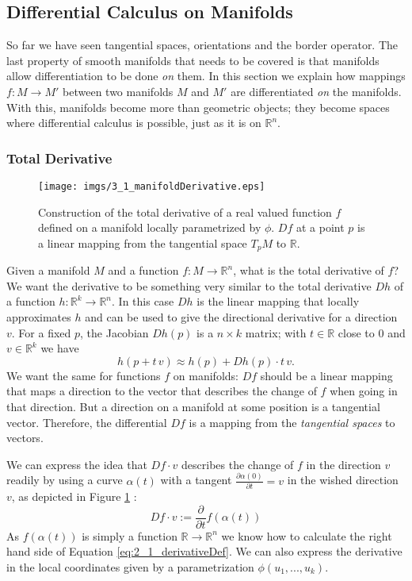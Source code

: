 \subsection{Differential Calculus on Manifolds}
\label{sec::2_derivativesOnMF}
So far we have seen tangential spaces, orientations and the border operator. The last property of smooth manifolds that needs to be covered is that manifolds allow differentiation to be done \emph{on} them. In this section we explain how mappings $f:M\to M'$ between two manifolds $M$ and $M'$ are differentiated \emph{on} the manifolds.  With this, manifolds become  more than geometric objects; they become spaces where differential calculus is possible, just as it is on $\mathbb R^n$. %

\subsubsection{Total Derivative}

\begin{figure}
\begin{center}
\texttt{[image: imgs/3\_1\_manifoldDerivative.eps]}
\end{center}
\caption{Construction of the total derivative of a real valued function $f$ defined on a manifold locally parametrized by $\phi$. $Df$ at a point $p$ is a linear mapping from the tangential space $T_p M$ to $\mathbb R$.}
\label{fig::3_1_manifoldDerivative}
\end{figure}

Given a manifold $M$ and a function $f: M \rightarrow \mathbb R^n$, what is the total derivative of $f$? We want the derivative to be something very similar to the total derivative $Dh$ of a function $h: \mathbb R^k \rightarrow \mathbb R^n$. In this case $Dh$ is the linear mapping that locally approximates $h$ and can be used to give the directional derivative for a direction $v$. For a fixed $p$, the Jacobian $Dh(p)$ is a $n\times k$ matrix; with $t \in \mathbb R$ close to 0 and $v \in \mathbb R^k$ we have 
\[h( p + t\,v) \approx h(p) + Dh(p) \cdot t\,v.\]
We want the same for functions $f$ on manifolds: $Df$ should be a linear mapping that maps a direction to the vector that describes the change of $f$ when going in that direction. But a direction on a manifold at some position is a tangential vector. Therefore, the differential $Df$ is a mapping from the \emph{tangential spaces} to vectors.

We can express the idea that $Df\cdot v$ describes the change of $f$ in the direction $v$ readily by using a curve $\alpha (t)$ with a tangent $\frac{\partial \alpha(0)}{\partial t} = v$ in the wished direction $v$, as depicted in Figure \ref{fig::3_1_manifoldDerivative} :
\begin{equation} Df \cdot v := \frac{\partial}{\partial t} f(\alpha(t)) \label{eq:2_1_derivativeDef}\end{equation}
As $f(\alpha(t))$ is simply a function $\mathbb R \rightarrow \mathbb R^n$ we know how to calculate the right hand side of Equation \ref{eq:2_1_derivativeDef}. We can also express the derivative in the local coordinates given by a parametrization $\phi(u_1,...,u_k)$.


